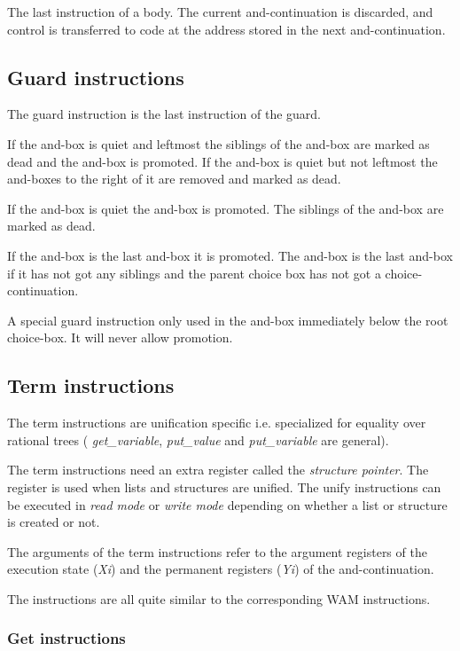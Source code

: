  The last instruction of a body.  The current
and-continuation is discarded, and control is transferred to code at
the address stored in the next and-continuation.


\subsection*{Guard instructions}

The guard instruction is the last instruction of the guard.

If the and-box is quiet and leftmost the siblings of the and-box are
marked as dead and the and-box is promoted.  If the
and-box is quiet but not leftmost the and-boxes to the right of it
are removed and marked as dead.

If the and-box is quiet the and-box is promoted. The siblings of 
the and-box are marked as dead.

If the and-box is the last and-box it is promoted. The and-box is the
last and-box if it has not got any siblings and the parent choice box
has not got a choice-continuation.

 A special guard instruction  only used in the and-box
immediately below the root choice-box. It will never allow promotion.

\subsection*{Term instructions}

The term instructions are unification specific i.e. specialized for
equality over rational trees ( {\em get\_variable}, {\em put\_value}
and {\em put\_variable} are general). 

The term instructions need an extra register called the {\em
structure pointer}. The register is used when lists and structures are
unified. The unify instructions can be executed in {\em read mode} or {\em
write mode} depending on whether a list or structure is created or not.

The arguments of the term instructions refer to the argument
registers of the execution state ({\em Xi}) and the permanent
registers ({\em Yi}) of the and-continuation.

The instructions are all quite similar to the corresponding WAM instructions. 

\subsubsection{Get instructions}

